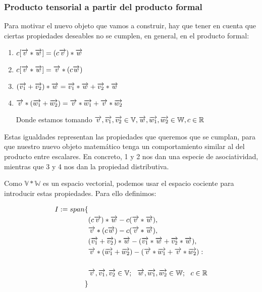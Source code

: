 \subsubsection{Producto tensorial a partir del producto formal} \label{sec:cociente_prod_formal}

Para motivar el nuevo objeto que vamos a construir, hay que tener en cuenta que ciertas propiedades deseables no se cumplen, en general, en el producto formal:

\begin{enumerate}
    \item $c [\overrightarrow{v} \ast \overrightarrow{w}] = (c\overrightarrow{v}) \ast \overrightarrow{w}$
    \item $c[\overrightarrow{v} \ast \overrightarrow{w}] = \overrightarrow{v} \ast (c\overrightarrow{w})$
    \item $(\overrightarrow{v_1} + \overrightarrow{v_2}) \ast \overrightarrow{w} = \overrightarrow{v_1} \ast \overrightarrow{w} + \overrightarrow{v_2} \ast \overrightarrow{w}$
    \item $\overrightarrow{v} \ast (\overrightarrow{w_1} + \overrightarrow{w_2}) = \overrightarrow{v} \ast \overrightarrow{w_1} + \overrightarrow{v} \ast \overrightarrow{w_2}$

Donde estamos tomando $\overrightarrow{v}, \overrightarrow{v_1}, \overrightarrow{v_2} \in \mathbb{V}, \overrightarrow{w}, \overrightarrow{w_1}, \overrightarrow{w_2} \in \mathbb{W}, c \in \mathbb{R}$
\end{enumerate}

Estas igualdades representan las propiedades que queremos que se cumplan, para que nuestro nuevo objeto matemático tenga un comportamiento similar al del producto entre escalares. En concreto, 1 y 2 nos dan una especie de asociatividad, mientras que 3 y 4 nos dan la propiedad distributiva.

Como $\mathbb{V} \ast \mathbb{W}$ es un espacio vectorial, podemos usar el espacio cociente para introducir estas propiedades. Para ello definimos:

\begin{equation}
\begin{split}
    I := span\{& \\
               & (c\overrightarrow{v}) \ast \overrightarrow{w} - c(\overrightarrow{v} \ast \overrightarrow{w}), \\
               & \overrightarrow{v} \ast (c\overrightarrow{w}) - c(\overrightarrow{v} \ast \overrightarrow{w}), \\
               & (\overrightarrow{v_1} + \overrightarrow{v_2}) \ast \overrightarrow{w} - (\overrightarrow{v_1} \ast \overrightarrow{w} + \overrightarrow{v_2} \ast \overrightarrow{w}), \\
               & \overrightarrow{v} \ast (\overrightarrow{w_1} + \overrightarrow{w_2}) - (\overrightarrow{v} \ast \overrightarrow{w_1} + \overrightarrow{v} \ast \overrightarrow{w_2}): \\
               & \\
               & \overrightarrow{v}, \overrightarrow{v_1}, \overrightarrow{v_2} \in \mathbb{V}; \ \  \overrightarrow{w}, \overrightarrow{w_1}, \overrightarrow{w_2} \in \mathbb{W}; \ \  c \in \mathbb{R} \\
\}&
\end{split}
\end{equation}


